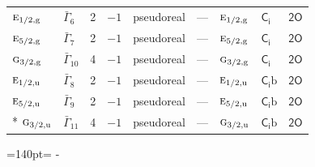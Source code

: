 \documentclass[10pt,a4paper]{article}
\newcommand{\needspace}[1]{\par\penalty-100\begingroup\dimen0=#1\relax\dimen2=\pagegoal
  \advance\dimen2-\pagetotal\ifdim\dimen0>\dimen2\relax\ifdim\dimen2>0pt\vfil\break\fi\fi
  \endgroup}
\numberwithin{equation}{section}
\newcommand{\grp}[1]{\mathsf{#1}}
\newcommand{\irr}[1]{\text{\normalfont\scshape #1}}
\newcommand{\ptag}[1]{\mathrm{#1}}
\newcommand{\secondclass}{\mathrm{b}}
\begin{document}
{\begin{longtable}{@{}llrrlllll@{}}
$\irr{e}_{1/2,\ptag{g}}$ & $\bar{\Gamma}_{6}$ & 2 & $-1$ & pseudoreal & --- & $\irr{e}_{1/2,\ptag{g}}$ & \href{S2.pdf}{$\grp{C_{i}}$} & \href{2O.pdf}{$\grp{2O}$}\\
$\irr{e}_{5/2,\ptag{g}}$ & $\bar{\Gamma}_{7}$ & 2 & $-1$ & pseudoreal & --- & $\irr{e}_{5/2,\ptag{g}}$ & \href{S2.pdf}{$\grp{C_{i}}$} & \href{2O.pdf}{$\grp{2O}$}\\
$\irr{g}_{3/2,\ptag{g}}$ & $\bar{\Gamma}_{10}$ & 4 & $-1$ & pseudoreal & --- & $\irr{g}_{3/2,\ptag{g}}$ & \href{S2.pdf}{$\grp{C_{i}}$} & \href{2O.pdf}{$\grp{2O}$}\\
$\irr{e}_{1/2,\ptag{u}}$ & $\bar{\Gamma}_{8}$ & 2 & $-1$ & pseudoreal & --- & $\irr{e}_{1/2,\ptag{u}}$ & \href{S2b.pdf}{$\grp{C_{i}}\secondclass$} & \href{2O.pdf}{$\grp{2O}$}\\
$\irr{e}_{5/2,\ptag{u}}$ & $\bar{\Gamma}_{9}$ & 2 & $-1$ & pseudoreal & --- & $\irr{e}_{5/2,\ptag{u}}$ & \href{S2b.pdf}{$\grp{C_{i}}\secondclass$} & \href{2O.pdf}{$\grp{2O}$}\\*
$\irr{g}_{3/2,\ptag{u}}$ & $\bar{\Gamma}_{11}$ & 4 & $-1$ & pseudoreal & --- & $\irr{g}_{3/2,\ptag{u}}$ & \href{S2b.pdf}{$\grp{C_{i}}\secondclass$} & \href{2O.pdf}{$\grp{2O}$}\\
\bottomrule\end{longtable}}
\needspace{140pt}
\end{document}
